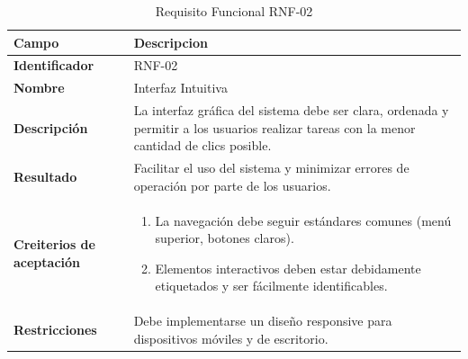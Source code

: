     \begin{table}[htb!]
        \centering
        \caption{Requisito Funcional RNF-02}
        \begin{tabular}{|p{3cm}|p{12cm}|}
        \hline
        \textbf{Campo} & \textbf{Descripcion} \\ \hline
        \textbf{Identificador} & RNF-02 \\ \hline
        \textbf{Nombre} & Interfaz Intuitiva \\ \hline
        \textbf{Descripción} & La interfaz gráfica del sistema debe ser clara, ordenada y permitir a los usuarios realizar tareas con la menor cantidad de clics posible. \\ \hline
        \textbf{Resultado} & Facilitar el uso del sistema y minimizar errores de operación por parte de los usuarios. \\ \hline
        \textbf{Creiterios de aceptación} & 
        \begin{enumerate}
            \item La navegación debe seguir estándares comunes (menú superior, botones claros).
            \item Elementos interactivos deben estar debidamente etiquetados y ser fácilmente identificables.
            
        \end{enumerate}
        \\ \hline
        \textbf{Restricciones} & Debe implementarse un diseño responsive para dispositivos móviles y de escritorio. \\ \hline
        
    \end{tabular}
    \end{table}
    \FloatBarrier


